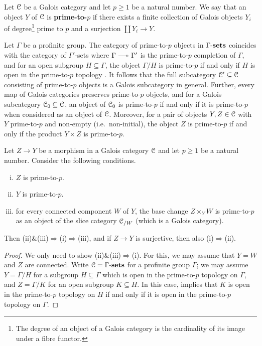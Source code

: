 \begin{defi} \label{def:prime-to-p-obj}
    Let ${\mathcal C}$ be a Galois category and let $p\geq 1$ be a natural number. We say that an object $Y$ of ${\mathcal C}$ is {\bf prime-to-$p$} if there exists a finite collection of Galois objects $Y_i$ of degree\footnote{The degree of an object of a Galois category is the cardinality of its image under a fibre functor.} prime to $p$ and a surjection $\coprod Y_i\to Y$. 
\end{defi}

\begin{rmk} \label{rmk:prime-to-p-obj}
    Let $\Gamma$ be a profinite group. The category of prime-to-$p$ objects in ${\Gamma\text{-}\mathbf{sets}}$ coincides with the category of $\Gamma'$-sets where $\Gamma \surj \Gamma'$ is the prime-to-$p$ completion of $\Gamma$, and for an open subgroup $H\subseteq \Gamma$, the object $\Gamma/H$ is prime-to-$p$ if and only if $H$ is open in the prime-to-$p$ topology \cite[\S 3.1]{RibesZalesskii}. It follows that the full subcategory ${\mathcal C}'\subseteq{\mathcal C}$ consisting of prime-to-$p$ objects is a Galois subcategory in general. Further, every map of Galois categories preserves prime-to-$p$ objects, and for a Galois subcategory ${\mathcal C}_0\subseteq {\mathcal C}$, an object of ${\mathcal C}_0$ is prime-to-$p$ if and only if it is prime-to-$p$ when considered as an object of ${\mathcal C}$. Moreover, for a pair of objects $Y,Z\in{\mathcal C}$ with $Y$ prime-to-$p$ and non-empty (i.e.\ non-initial), the object $Z$ is prime-to-$p$ if and only if the product $Y\times Z$ is prime-to-$p$.
\end{rmk}

\begin{lem} \label{lem:wreath}
    Let $Z\to Y$ be a morphism in a Galois category ${\mathcal C}$ and let $p\geq 1$ be a natural number. Consider the following conditions.
    \begin{enumerate}[(i)]
        \item $Z$ is prime-to-$p$.
        \item $Y$ is prime-to-$p$.
        \item for every connected component $W$ of $Y$, the base change $Z\times_Y W$ is prime-to-$p$ as an object of the slice category ${\mathcal C}_{/W}$ (which is a Galois category).
    \end{enumerate}
    Then (ii)\&(iii)$\Rightarrow$(i)$\Rightarrow$(iii), and if $Z\to Y$ is surjective, then also (i)$\Rightarrow$(ii).
\end{lem}

\begin{proof}
We only need to show (ii)\&(iii)$\Rightarrow$(i). For this, we may assume that $Y=W$ and $Z$ are connected. Write ${\mathcal C} = {\Gamma\text{-}\mathbf{sets}}$ for a profinite group $\Gamma$; we may assume $Y=\Gamma/H$ for a subgroup $H\subseteq \Gamma$ which is open in the prime-to-$p$ topology on $\Gamma$, and $Z = \Gamma/K$ for an open subgroup $K\subseteq H$. In this case, \cite[Lemma~3.1.4]{RibesZalesskii} implies that $K$ is open in the prime-to-$p$ topology on $H$ if and only if it is open in the prime-to-$p$ topology on $\Gamma$.
\end{proof}

